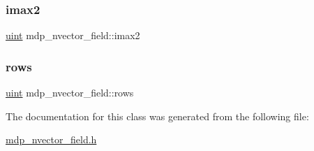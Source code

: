 \mbox{\label{classmdp__nvector__field_ac123ef55f792faa34a2429853f7872f6}} 
\subsubsection{\texorpdfstring{imax2}{imax2}}
{\footnotesize\ttfamily \hyperlink{mdp__global__vars_8h_a91ad9478d81a7aaf2593e8d9c3d06a14}{uint} mdp\+\_\+nvector\+\_\+field\+::imax2}

\mbox{\label{classmdp__nvector__field_a8938e7e300995ed6733a2c405a80cfb3}} 
\subsubsection{\texorpdfstring{rows}{rows}}
{\footnotesize\ttfamily \hyperlink{mdp__global__vars_8h_a91ad9478d81a7aaf2593e8d9c3d06a14}{uint} mdp\+\_\+nvector\+\_\+field\+::rows}



The documentation for this class was generated from the following file\+:\begin{DoxyCompactItemize}
\item 
\hyperlink{mdp__nvector__field_8h}{mdp\+\_\+nvector\+\_\+field.\+h}\end{DoxyCompactItemize}
